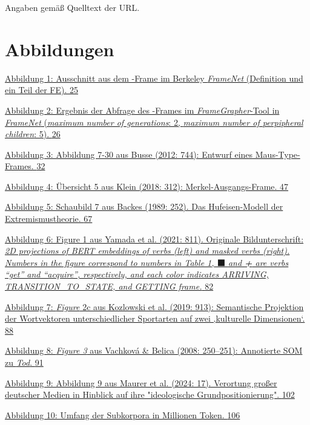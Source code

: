 Angaben gemäß Quelltext der URL.

\section{Abbildungen}\label{abbildungen}

\hyperref[_Ref162016903]{Abbildung 1: Ausschnitt aus dem -Frame im Berkeley \emph{FrameNet} (Definition und ein Teil der FE). \hyperref[_Ref162016903]{25}}

\hyperref[_Ref162016914]{Abbildung 2: Ergebnis der Abfrage des -Frames im \emph{FrameGrapher}-Tool in \emph{FrameNet} (\emph{maximum number of generations}: 2, \emph{maximum number of perpipheral children}: 5). \hyperref[_Ref162016914]{26}}

\hyperref[_Ref162016924]{Abbildung 3: Abbildung 7-30 aus Busse (2012: 744): Entwurf eines Maus-Type-Frames. \hyperref[_Ref162016924]{32}}

\hyperref[_Ref162017471]{Abbildung 4: Übersicht 5 aus Klein (2018: 312): Merkel-Ausgangs-Frame. \hyperref[_Ref162017471]{47}}

\hyperref[_Ref162016948]{Abbildung 5: Schaubild 7 aus Backes (1989: 252). Das Hufeisen-Modell der Extremismustheorie. \hyperref[_Ref162016948]{67}}

\hyperref[_Ref162016958]{Abbildung 6: Figure 1 aus Yamada et al. (2021: 811). Originale Bildunterschrift: \emph{2D projections of BERT embeddings of verbs (left) and masked verbs (right). Numbers in the figure correspond to numbers in Table 1,} ⬛ \emph{and \textbf{+} are verbs ``get'' and ``acquire'', respectively, and each color indicates ARRIVING, TRANSITION\_TO\_STATE, and GETTING frame.} \hyperref[_Ref162016958]{82}}

\hyperref[_Ref162016965]{Abbildung 7: \emph{Figure} 2c aus Kozlowski et al. (2019: 913): Semantische Projektion der Wortvektoren unterschiedlicher Sportarten auf zwei ‚kulturelle Dimensionen`. \hyperref[_Ref162016965]{88}}

\hyperref[_Ref162016973]{Abbildung 8: \emph{Figure 3} aus Vachková \& Belica (2008: 250--251): Annotierte SOM zu \emph{Tod}. \hyperref[_Ref162016973]{91}}

\hyperref[_Ref180396143]{Abbildung 9: Abbildung 9 aus Maurer et al. (2024: 17). Verortung großer deutscher Medien in Hinblick auf ihre "ideologische Grundpositionierung". \hyperref[_Ref180396143]{102}}

\hyperref[_Ref162016992]{Abbildung 10: Umfang der Subkorpora in Millionen Token. \hyperref[_Ref162016992]{106}}

